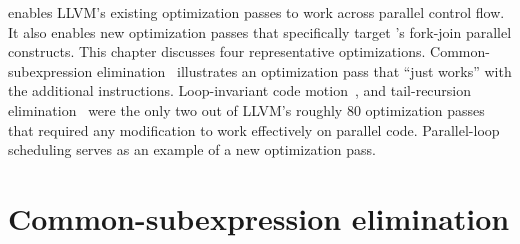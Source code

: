 
\tapir enables LLVM's existing optimization passes
\cite{LLVMPassesManual15} to work across parallel control flow.  It
also enables new optimization passes that specifically target \tapir's
fork-join parallel constructs.  This chapter discusses four
representative optimizations.  Common-subexpression elimination\
\cite[Sec.~12.2]{Muchnick97} illustrates an optimization pass that
``just works'' with the additional \tapir instructions.
Loop-invariant code motion\ \cite[Sec.~13.2]{Muchnick97}, and
tail-recursion elimination\ \cite[Sec.~15.1]{Muchnick97} were the only
two out of LLVM's roughly $80$ optimization passes that required any
modification to work effectively on parallel code.  Parallel-loop
scheduling serves as an example of a new optimization pass.



\section{Common-subexpression elimination}


